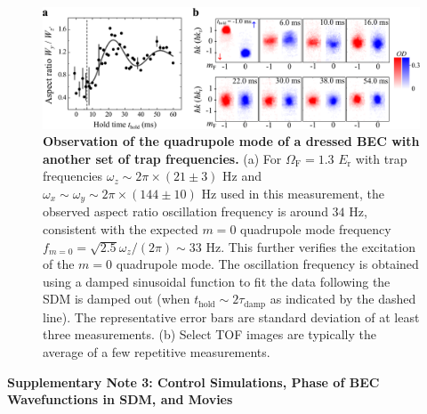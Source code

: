 \documentclass[showpacs,preprintnumbers,amsmath,amssymb, superscriptaddress, aps, reprint]{revtex4-1}
\def\E_r{E_{\text{r}}}
\def\OmegaF{\Omega_{\text{F}}}
\def\thold{t_{\text{hold}}}
\def\taudamp{\tau_{\text{damp}}}
\begin{document}
{{\vspace{10mm}
\begin{figure}[h]
\centering
\includegraphics[width=6.6in]{SI_Fig3_diffTrap_Vfinal.pdf}
\caption{\textbf{Observation of the quadrupole mode of a dressed BEC with another set of trap frequencies.} (a) For $\OmegaF = 1.3$ $\E_r$ with trap frequencies ${\omega _z}\sim 2\pi\times (21 \pm 3)$ Hz and ${\omega _x}\sim{\omega _y}\sim 2\pi\times(144\pm 10)$ Hz used in this measurement, the observed aspect ratio oscillation frequency is around $34$ Hz, consistent with the expected ${m=0}$ quadrupole mode frequency ${f_{m=0}} = \sqrt{2.5}{\omega_z}/(2\pi)\sim 33$ Hz. This further verifies the excitation of the $m = 0$ quadrupole mode. The oscillation frequency is obtained using a damped sinusoidal function to fit the data following the SDM is damped out (when ${\thold}\sim 2{\taudamp}$ as indicated by the dashed line). The representative error bars are standard deviation of at least three measurements. (b) Select TOF images are typically the average of a few repetitive measurements.}
\label{FigSI_shapeOsc_diffTrap}
\end{figure} 



\newpage
\begin{center}
\textbf{Supplementary Note 3: Control Simulations, Phase of BEC Wavefunctions in SDM, and Movies}
\end{center}

}}
\end{document}
